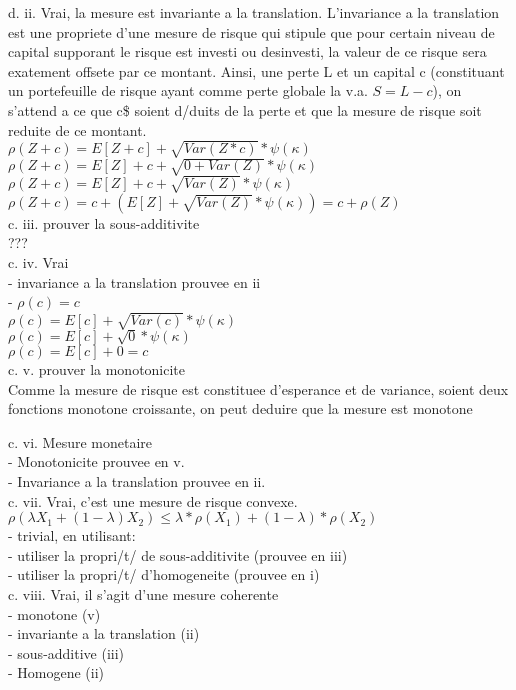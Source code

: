 d. ii. Vrai, la mesure est invariante a la translation. L'invariance a la translation est une propriete d'une mesure de risque qui stipule que pour certain niveau de capital supporant le risque est investi ou desinvesti, la valeur de ce risque sera exatement offsete par ce montant. Ainsi, une perte L et un capital c (constituant un portefeuille de risque ayant comme perte globale la v.a. $S = L-c$), on s'attend a ce que c\$ soient d/duits de la perte et que la mesure de risque soit reduite de ce montant. \\

$\rho(Z+c) = E[Z+c] + \sqrt{Var(Z*c)} * \psi(\kappa)$\\
$\rho(Z+c) = E[Z]+c + \sqrt{0+Var(Z)} * \psi(\kappa)$\\
$\rho(Z+c) = E[Z]+c + \sqrt{Var(Z)} * \psi(\kappa)$\\
$\rho(Z+c) = c + (E[Z] + \sqrt{Var(Z)} * \psi(\kappa)) = c + \rho(Z)$\\

c. iii. prouver la sous-additivite\\
???\\

c. iv. Vrai \\
- invariance a la translation prouvee en ii\\
- $\rho(c) = c$\\

$\rho(c) = E[c] + \sqrt{Var(c)} * \psi(\kappa)$\\
$\rho(c) = E[c] + \sqrt{0} * \psi(\kappa)$\\
$\rho(c) = E[c] + 0 = c$\\

c. v. prouver la monotonicite\\
Comme la mesure de risque est constituee d'esperance et de variance, soient deux fonctions monotone croissante, on peut deduire que la mesure est monotone

c. vi. Mesure monetaire\\
- Monotonicite prouvee en v.\\
- Invariance a la translation prouvee en ii.\\ 

c. vii. Vrai, c'est une mesure de risque convexe. \\
$\rho(\lambda X_1 + (1-\lambda)X_2) \leq \lambda*\rho(X_1) + (1-\lambda)*\rho(X_2)$\\
- trivial, en utilisant:\\
- utiliser la propri/t/ de sous-additivite (prouvee en iii)\\
- utiliser la propri/t/ d'homogeneite (prouvee en i)\\

c. viii. Vrai, il s'agit d'une mesure coherente\\
- monotone (v)\\
- invariante a la translation (ii)\\
- sous-additive (iii)\\
- Homogene (ii)\\
